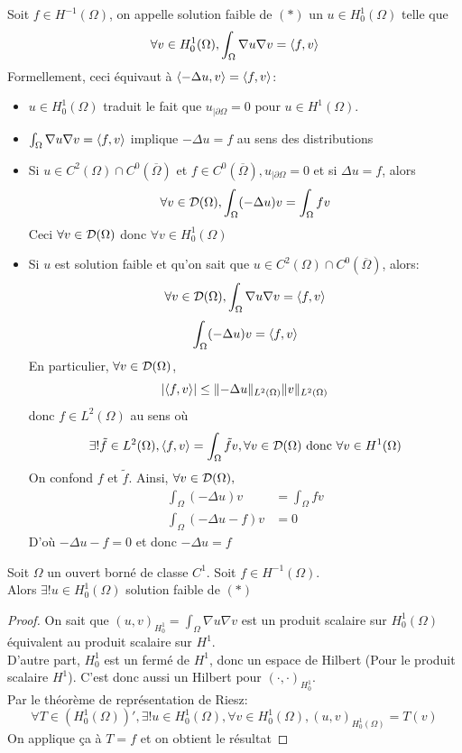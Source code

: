 \documentclass[]{report}
\begin{document}
    \begin{df}{}{}
        Soit $f\in H^{-1}(\Omega)$, on appelle solution faible de $(*)$ un $u\in H_0^1(\Omega)$ telle que
        \[\forall v\in H_0^1(\Omega),\int_\Omega \nabla u\nabla v=\langle f,v \rangle\]
        Formellement, ceci équivaut à $\langle -\Delta u,v \rangle=\langle f,v \rangle$:
        \begin{itemize}
            \item $u\in H_0^1(\Omega)$ traduit le fait que $u_{|\partial \Omega}=0$ pour $u\in H^1(\Omega)$.
            \item $\int_\Omega \nabla u\nabla v=\langle f,v \rangle$ implique $-\Delta u=f$ au sens des distributions
            \item Si $u\in C^2(\Omega)\cap C^0(\overline{\Omega})$ et $f\in C^0(\overline{\Omega}), u_{|\partial \Omega}=0$ et si $\Delta u=f$, alors
            \[\forall v\in \mathcal{D}(\Omega),\int_\Omega (-\Delta u) v=\int_\Omega fv\]
            Ceci $\forall v\in \mathcal{D}(\Omega)$ donc $\forall v\in H_0^1(\Omega)$
            \item Si $u$ est solution faible et qu'on sait que $u\in C^2(\Omega)\cap C^0(\overline{\Omega})$, alors:
            \[\forall v\in \mathcal{D}(\Omega),\int_\Omega \nabla u\nabla v=\langle f,v \rangle\]
            \[\int_\Omega (-\Delta u)v=\langle f,v \rangle\]
            En particulier, $\forall v\in \mathcal{D}(\Omega)$,
            \[\left|\langle f,v \rangle\right|\le \lVert -\Delta u \rVert_{L^2(\Omega)}\lVert v \rVert_{L^2(\Omega)}\] 
            donc $f\in L^2(\Omega)$ au sens où
            \[\exists! \tilde{f}\in L^2(\Omega),\langle f,v \rangle=\int_\Omega \tilde{f}v,\forall v\in \mathcal{D}(\Omega) \text{ donc $\forall v\in H^1(\Omega)$}\]
            On confond $f$ et $\tilde{f}$. Ainsi, $\forall v\in \mathcal{D}(\Omega),$
            \begin{align*}
                \int_\Omega (-\Delta u)v&=\int_\Omega fv\\
                \int_\Omega (-\Delta u-f)v&=0
            \end{align*}
            D'où $-\Delta u -f=0$ et donc $-\Delta u=f$
        \end{itemize}
    \end{df}

    \begin{tm}{}{}
        Soit $\Omega$ un ouvert borné de classe $C^1$. Soit $f\in H^{-1}(\Omega)$.\\
        Alors $\exists! u\in H_0^1(\Omega)$ solution faible de $(*)$
    \end{tm}

    \begin{proof}
        On sait que $(u,v)_{H_0^1}=\int_\Omega \nabla u\nabla v$ est un produit scalaire sur $H_0^1(\Omega)$ équivalent au produit scalaire sur $H^1$.\\
        D'autre part, $H_0^1$ est un \sev fermé de $H^1$, donc un espace de Hilbert (Pour le produit scalaire $H^1$). C'est donc aussi un Hilbert pour $(\cdot,\cdot)_{H_0^1}$.\\
        Par le théorème de représentation de Riesz:
        \[\forall T\in (H_0^1(\Omega))',\exists! u\in H_0^1(\Omega),\forall v\in H_0^1(\Omega),(u,v)_{H_0^1(\Omega)}=T(v)\]
        On applique ça à $T=f$ et on obtient le résultat
    \end{proof}
\end{document}
